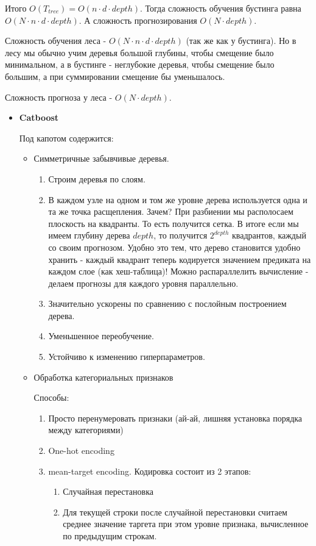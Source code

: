 \documentclass[12pt]{article}
\begin{document}
\begin{itemize}
Итого $O(T_{tree}) = O(n \cdot d \cdot depth)$. Тогда сложность обучения бустинга равна $O(N \cdot n \cdot d \cdot depth)$.
А сложность прогнозирования $O(N \cdot depth)$.

Сложность обучения леса - $O(N \cdot n \cdot d \cdot depth)$ (так же как у бустинга). Но в лесу мы обычно учим деревья большой глубины, чтобы смещение было минимальном, а в бустинге - неглубокие деревья, чтобы смещение было большим, а при суммировании смещение бы уменьшалось.

Сложность прогноза у леса -  $O(N \cdot depth)$.

\begin{itemize}

\item \textbf{Catboost}

Под капотом содержится:
\begin{itemize}

\item Симметричные забывчивые деревья.

\begin{enumerate}
\item Строим деревья по слоям.
\item В каждом узле на одном и том же уровне дерева используется одна и та же точка расщепления. Зачем? При разбиении мы располосаем плоскость на квадранты. То есть получится сетка. В итоге если мы имеем глубину дерева $depth$, то получится $2^{depth}$ квадрантов, каждый со своим прогнозом. Удобно это тем, что дерево становится удобно хранить - каждый квадрант теперь кодируется значением предиката на каждом слое (как хеш-таблица)! Можно распараллелить вычисление - делаем прогнозы для каждого уровня параллельно.
\item Значительно ускорены по сравнению с послойным построением дерева.

\item Уменьшенное переобучение.

\item Устойчиво к изменению гиперпараметров.
\end{enumerate}

\item Обработка категориальных признаков

Способы:
\begin{enumerate}

\item Просто перенумеровать признаки (ай-ай, лишняя установка порядка между категориями)
\item One-hot encoding
\item mean-target encoding. Кодировка состоит из 2 этапов:
\begin{enumerate}
\item Случайная перестановка
\item Для текущей строки после случайной перестановки считаем среднее значение таргета при этом уровне признака, вычисленное по предыдущим строкам.
\end{enumerate}


\end{enumerate}
\end{itemize}
\end{itemize}
\end{itemize}
\end{document}
